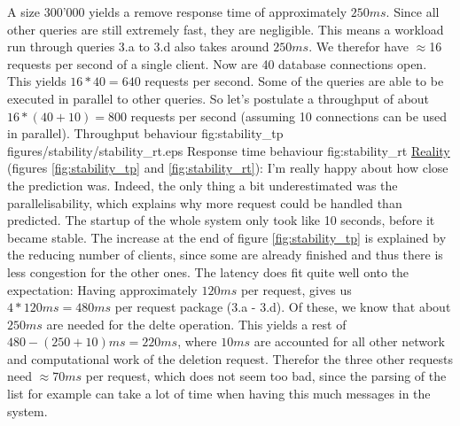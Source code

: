 \documentclass[11pt]{article}
\begin{document}
A size 300'000 yields a remove response time of approximately $250ms$. Since all other queries are still extremely fast, they are negligible. This means a workload run through queries 3.a to 3.d also takes around $250ms$. We therefor have $\approx$16 requests per second of a single client. Now are 40 database connections open. This yields $16*40=640$ requests per second. Some of the queries are able to be executed in parallel to other queries. So let's postulate a throughput of about $16*(40+10)=800$ requests per second (assuming 10 connections can be used in parallel).
 {Throughput behaviour} {fig:stability_tp}
		{figures/stability/stability_rt.eps} {Response time behaviour} {fig:stability_rt}
\newline\underline{Reality} (figures \ref{fig:stability_tp} and \ref{fig:stability_rt}): I'm really happy about how close the prediction was. Indeed, the only thing a bit underestimated was the parallelisability, which explains why more request could be handled than predicted. The startup of the whole system only took like 10 seconds, before it became stable. The increase at the end of figure \ref{fig:stability_tp} is explained by the reducing number of clients, since some are already finished and thus there is less congestion for the other ones. The latency does fit quite well onto the expectation: Having approximately $120ms$ per request, gives us $4*120ms=480ms$ per request package (3.a - 3.d). Of these, we know that about $250ms$ are needed for the delte operation. This yields a rest of $480-(250+10)ms=220ms$, where $10ms$ are accounted for all other network and computational work of the deletion request. Therefor the three other requests need $\approx70ms$ per request, which does not seem too bad, since the parsing of the list for example can take a lot of time when having this much messages in the system.
\end{document}
